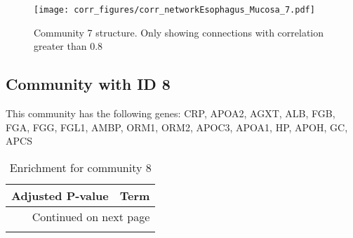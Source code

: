\begin{figure}[h!]
\centering
\texttt{[image: corr\_figures/corr\_networkEsophagus\_Mucosa\_7.pdf]}
\caption{Community 7 structure. Only showing connections with correlation greater than 0.8}
\end{figure}




\subsection*{Community with ID 8}
This community has the following genes: CRP, APOA2, AGXT, ALB, FGB, FGA, FGG, FGL1, AMBP, ORM1, ORM2, APOC3, APOA1, HP, APOH, GC, APCS
\\
\begin{longtable}{p{2.4cm}p{14.5cm}}
\caption{Enrichment for community 8}\\
\toprule
Adjusted \newline P-value &                                                                                 Term \\
\midrule
\endhead
\midrule
\multicolumn{2}{r}{{Continued on next page}} \\
\midrule
\endfoot


\end{longtable}
